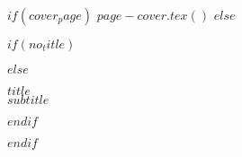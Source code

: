 

$if(cover_page)$
  $page-cover.tex()$
$else$

$if(no_title)$

$else$
\begin{spacing}{2.0}
\noindent
{\huge {\MakeUppercase{$title$}}}\\
{\Large {$subtitle$}}
\end{spacing}

$endif$ %

$endif$ %


